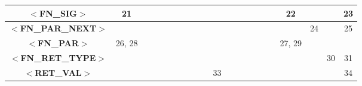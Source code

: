 \documentclass[a4paper,11pt]{article}
\begin{document}
\begin{table}[htbp]
\begin{tabular}{|c||c|c|c|c|c|c|c|c|c|c|c|c|c|c|c|c|c|c|c|c|}
\hline
\textbf{$<$FN\_SIG$>$}       & \multicolumn{1}{c|}{21}     &                        &                        &                         &                           &                             &                              &                             &                             &                          &                           &                         &                          &                          &                            &                         & \multicolumn{1}{c|}{22}     &                         &                           & 23                     \\ 
\hline
\textbf{$<$FN\_PAR\_NEXT$>$} &                             &                        &                        &                         &                           &                             &                              &                             &                             &                          &                           &                         &                          &                          &                            &                         &                             & \multicolumn{1}{c|}{24} &                           & 25                     \\ 
\hline
\textbf{$<$FN\_PAR$>$}       & \multicolumn{1}{c|}{26, 28} &                        &                        &                         &                           &                             &                              &                             &                             &                          &                           &                         &                          &                          &                            &                         & \multicolumn{1}{c|}{27, 29} &                         &                           & \multicolumn{1}{l|}{}  \\ 
\hline
\textbf{$<$FN\_RET\_TYPE$>$} &                             &                        &                        &                         &                           &                             &                              &                             &                             &                          &                           &                         &                          &                          &                            &                         &                             &                         & \multicolumn{1}{c|}{30}   & 31                     \\ 
\hline
\textbf{$<$RET\_VAL$>$}      &                             &                        &                        &                         &                           &                             &                              &                             &                             & \multicolumn{1}{c|}{33}  &                           &                         &                          &                          &                            &                         &                             &                         &                           & 34                     \\ 

\end{tabular}
\end{table}
\end{document}

